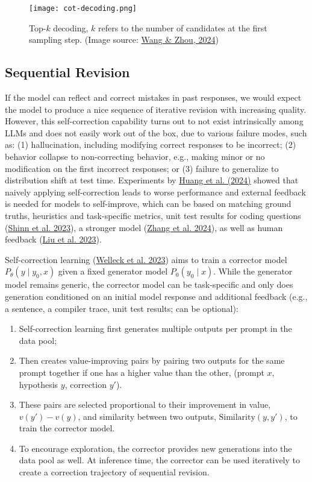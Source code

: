 \documentclass[12pt]{article}
\begin{document}
\begin{figure}[h]
    \centering
    \texttt{[image: cot-decoding.png]}
    \caption{Top-$k$ decoding, $k$ refers to the number of candidates at the first sampling step. (Image source: \href{https://arxiv.org/abs/2402.10200}{Wang \& Zhou, 2024})}
\end{figure}

\subsection{Sequential Revision}

If the model can reflect and correct mistakes in past responses, we would expect the model to produce a nice sequence of iterative revision with increasing quality. However, this self-correction capability turns out to not exist intrinsically among LLMs and does not easily work out of the box, due to various failure modes, such as: (1) hallucination, including modifying correct responses to be incorrect; (2) behavior collapse to non-correcting behavior, e.g., making minor or no modification on the first incorrect responses; or (3) failure to generalize to distribution shift at test time. Experiments by \href{https://arxiv.org/abs/2310.01798}{Huang et al. (2024)} showed that naively applying self-correction leads to worse performance and external feedback is needed for models to self-improve, which can be based on matching ground truths, heuristics and task-specific metrics, unit test results for coding questions (\href{https://arxiv.org/abs/2303.11366}{Shinn et al. 2023}), a stronger model (\href{https://arxiv.org/abs/2404.17140}{Zhang et al. 2024}), as well as human feedback (\href{https://arxiv.org/abs/2302.02676}{Liu et al. 2023}).

Self-correction learning (\href{https://arxiv.org/abs/2211.00053}{Welleck et al. 2023}) aims to train a corrector model $P_\theta(y \mid y_0, x)$ given a fixed generator model $P_0(y_0 \mid x)$. While the generator model remains generic, the corrector model can be task-specific and only does generation conditioned on an initial model response and additional feedback (e.g., a sentence, a compiler trace, unit test results; can be optional):
\begin{enumerate}
    \item Self-correction learning first generates multiple outputs per prompt in the data pool;
    \item Then creates value-improving pairs by pairing two outputs for the same prompt together if one has a higher value than the other, (prompt $x$, hypothesis $y$, correction $y'$).
    \item These pairs are selected proportional to their improvement in value, $v(y') - v(y)$, and similarity between two outputs, $\text{Similarity}(y, y')$, to train the corrector model.
    \item To encourage exploration, the corrector provides new generations into the data pool as well. At inference time, the corrector can be used iteratively to create a correction trajectory of sequential revision.
\end{enumerate}
\end{document}
